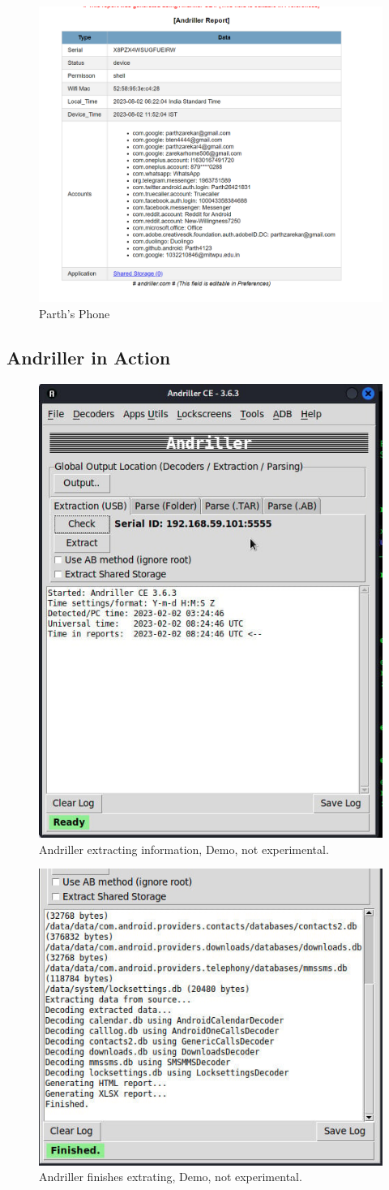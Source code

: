 \documentclass[11pt]{article}
\begin{document}
\begin{figure}[H]
    \centering
    \includegraphics[width=.95\textwidth]{./Screenshot 2023-08-02 062224.png}
    \caption{Parth's Phone}
\end{figure}


\subsection{Andriller in Action}
\begin{figure}[H]
    \centering
    \includegraphics[width=.45\textwidth]{./Picture3-18-18.jpg}
    \caption{Andriller extracting information, Demo, not experimental. }
\end{figure}

\begin{figure}[H]
    \centering
    \includegraphics[width=.45\textwidth]{./Picture4-16-18.jpg}
    \caption{Andriller finishes extrating, Demo, not experimental. }
\end{figure}
\end{document}
